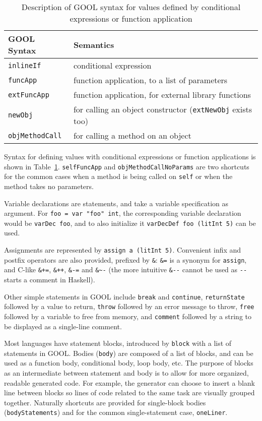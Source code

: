 \documentclass[sigplan,review,anonymous,prologue,dvipsnames]{acmart}
\begin{document}
\begin{table}[!h]
	\caption{Description of GOOL syntax for values defined by conditional 
	expressions or function application}
	\begin{tabular}{p{} p{}}
		\textbf{GOOL Syntax} & \textbf{Semantics} \\
		\midrule
		\verb|inlineIf| & conditional expression \\
		\verb|funcApp| & function application, to a list of parameters \\
		\verb|extFuncApp| & function application, for external library 
		functions\\
		\verb|newObj| & for calling an object constructor (\verb|extNewObj| 
		exists too) \\
		\verb|objMethodCall| & for calling a method on an object \\
	\end{tabular}
	\label{tab:values}
\end{table}

Syntax for defining values with conditional expressions or function 
applications is shown in Table~\ref{tab:values}. \verb|selfFuncApp| and 
\verb|objMethodCallNoParams| are two shortcuts for the common cases when a 
method is being called on \verb|self| or when the method takes no parameters. 

Variable declarations are statements, and take a variable specification
as argument. For \verb|foo = var "foo" int|, the corresponding variable
declaration would be \verb|varDec foo|, and to also initialize it
\verb|varDecDef foo (litInt 5)| can be used. 

Assignments are represented by \verb|assign a (litInt 5)|. Convenient
infix and postfix operators are also provided, prefixed by \verb|&|:
\verb|&=| is a synonym for \verb|assign|, and C-like 
\verb|&+=|, \verb|&++|, \verb|&-=| and \verb|&~-| (the more intuitive
\verb|&--| cannot be used as \verb|--| starts a comment in Haskell).

Other simple statements in GOOL include \verb|break| and \verb|continue|, 
\verb|returnState| followed by a value to return, \verb|throw| followed by an 
error message to throw, \verb|free| followed by a variable to free from
memory, and \verb|comment| followed by a string to be displayed as a 
single-line comment.

Most languages have statement blocks, introduced by \verb|block| with
a list of statements in GOOL. Bodies (\verb|body|) are composed
of a list of blocks, and can be used as a function body, conditional body, loop
body, etc. The purpose of blocks as an intermediate between statement and body
is to allow for more organized, readable generated code. For example, the
generator can choose to insert a blank line between blocks so lines of code
related to the same task are visually grouped together. Naturally shortcuts
are provided for single-block bodies (\verb|bodyStatements|) and
for the common single-statement case, \verb|oneLiner|. 
 
\end{document}
